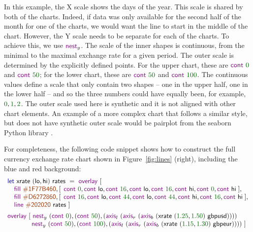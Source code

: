 \documentclass{jfp}
\newcommand{\num}[1]{\textcolor{numclr}{#1}}
\newcommand{\strf}[1]{\textnormal{\textcolor{strclr}{\sffamily #1}}}
\newcommand{\ident}[1]{\textnormal{\textcolor{idclr}{\sffamily #1}}}
\newcommand{\kvd}[1]{\textnormal{\textcolor{kvdclr}{\sffamily #1}}}
\newcommand{\fkvd}[1]{\textnormal{\textcolor{fkvdclr}{\sffamily #1}}}
\begin{document}
\vspace{-0.5em}
\noindent
In this example, the X scale shows the days of the year. This scale is shared by both of the charts.
Indeed, if data was only available for the second half of the month for one of the charts,
we would want the line to start in the middle of the chart. However, the Y scale needs to be
separate for each of the charts. To achieve this, we use $\kvd{nest}_y$. The scale of the inner
shapes is continuous, from the minimal to the maximal exchange rate for a given period. The
outer scale is determined by the explicitly defined points. For the upper chart, these are
$\kvd{cont}~\num{0}$ and $\kvd{cont}~\num{50}$; for the lower chart, these are
$\kvd{cont}~\num{50}$ and $\kvd{cont}~\num{100}$. The continuous values define a scale that only
contain two shapes -- one in the upper half, one in the lower half -- and so the three numbers could
have equally been, for example, $\num{0},\num{1}, \num{2}$. The outer scale used here is
synthetic and it is not aligned with other chart elements. An example of a more complex chart
that follows a similar style, but does not have synthetic outer scale would be pairplot from
the seaborn Python library \cite{seaborn}.

For completeness, the following code snippet shows how to construct the full currency exchange
rate chart shown in Figure~\ref{fig:lines} (right), including the blue and red background:
%
\begin{equation*}
\begin{array}{l}
\fkvd{let}~\ident{xrate}~(\ident{lo}, \ident{hi})~\ident{rates}~=\kvd{overlay}~[\\
\quad \kvd{fill}~\strf{\#1F77B460}, [\;\,\kvd{cont}~\num{0}, \kvd{cont}~\ident{lo}, \kvd{cont}~\num{16}, \kvd{cont}~\ident{lo}, \kvd{cont}~\num{16}, \kvd{cont}~\ident{hi}, \kvd{cont}~\num{0}, \kvd{cont}~\ident{hi}\;],\\
\quad \kvd{fill}~\strf{\#D6272860}, [\;\,\kvd{cont}~\num{16}, \kvd{cont}~\ident{lo}, \kvd{cont}~\num{44}, \kvd{cont}~\ident{lo}, \kvd{cont}~\num{44}, \kvd{cont}~\ident{hi}, \kvd{cont}~\num{16}, \kvd{cont}~\ident{hi}\;],\\
\quad \kvd{line}~\strf{\#202020}~\ident{rates}~]\\[0.5em]
\kvd{overlay}~[~
\kvd{nest}_y~(\kvd{cont}~\num{0}),(\kvd{cont}~\num{50}), (\kvd{axis}_l~(\kvd{axis}_r~(\kvd{axis}_b~(\ident{xrate}~(\num{1.25}, \num{1.50})~\ident{gbpusd}))))\\
\hspace{3.68em} \kvd{nest}_y~(\kvd{cont}~\num{50}),(\kvd{cont}~\num{100}), (\kvd{axis}_l~(\kvd{axis}_r~(\kvd{axis}_b~(\ident{xrate}~(\num{1.15}, \num{1.30})~\ident{gbpeur}))))~]\\
\end{array}
\end{equation*}
\end{document}
